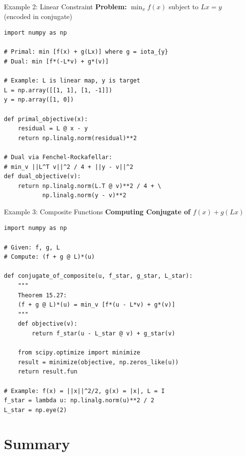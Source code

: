 \documentclass[aspectratio=169,10pt]{beamer}
\begin{document}
\begin{frame}[fragile]{Example 2: Linear Constraint}
  \textbf{Problem:} $\min_x f(x)$ subject to $Lx = y$ (encoded in conjugate)
  
  \vspace{0.3cm}
  
  \begin{lstlisting}
import numpy as np

# Primal: min [f(x) + g(Lx)] where g = iota_{y}
# Dual: min [f*(-L*v) + g*(v)]

# Example: L is linear map, y is target
L = np.array([[1, 1], [1, -1]])
y = np.array([1, 0])

def primal_objective(x):
    residual = L @ x - y
    return np.linalg.norm(residual)**2

# Dual via Fenchel-Rockafellar:
# min_v ||L^T v||^2 / 4 + ||y - v||^2
def dual_objective(v):
    return np.linalg.norm(L.T @ v)**2 / 4 + \
           np.linalg.norm(y - v)**2
  \end{lstlisting}
\end{frame}

\begin{frame}[fragile]{Example 3: Composite Functions}
  \textbf{Computing Conjugate of $f(x) + g(Lx)$}

  \vspace{0.3cm}

  \begin{lstlisting}
import numpy as np

# Given: f, g, L
# Compute: (f + g @ L)*(u)

def conjugate_of_composite(u, f_star, g_star, L_star):
    """
    Theorem 15.27:
    (f + g @ L)*(u) = min_v [f*(u - L*v) + g*(v)]
    """
    def objective(v):
        return f_star(u - L_star @ v) + g_star(v)

    from scipy.optimize import minimize
    result = minimize(objective, np.zeros_like(u))
    return result.fun

# Example: f(x) = ||x||^2/2, g(x) = |x|, L = I
f_star = lambda u: np.linalg.norm(u)**2 / 2
L_star = np.eye(2)
  \end{lstlisting}
\end{frame}


\section{Summary}
\end{document}
